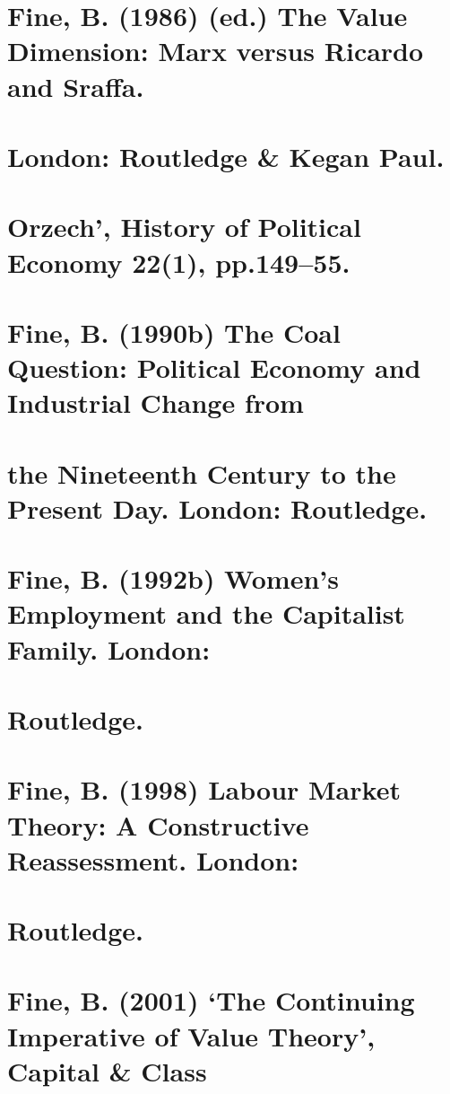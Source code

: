 \section{Fine, B. (1986) (ed.) The Value Dimension: Marx versus Ricardo and Sraffa.}


\section{London: Routledge & Kegan Paul.}


\section{Orzech’, History of Political Economy 22(1), pp.149–55.}


\section{Fine, B. (1990b) The Coal Question: Political Economy and Industrial Change from}


\section{the Nineteenth Century to the Present Day. London: Routledge.}


\section{Fine, B. (1992b) Women’s Employment and the Capitalist Family. London:}


\section{Routledge.}


\section{Fine, B. (1998) Labour Market Theory: A Constructive Reassessment. London:}


\section{Routledge.}


\section{Fine, B. (2001) ‘The Continuing Imperative of Value Theory’, Capital & Class}


